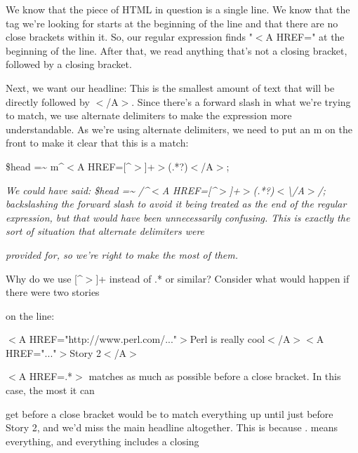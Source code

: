 \documentclass[a4paper,11pt]{book}
\begin{document}
\noindent We know that the piece of HTML in question is a single line. We know that the tag we're looking for starts at the beginning of the line and that there are no close brackets within it. So, our regular expression finds "$<$A HREF=" at the beginning of the line. After that, we read anything that's not a closing bracket, followed by a closing bracket.

\noindent 

\noindent Next, we want our headline: This is the smallest amount of text that will be directly followed by $<$/A$>$. Since there's a forward slash in what we're trying to match, we use alternate delimiters to make the expression more understandable. As we're using alternate delimiters, we need to put an m on the front to make it clear that this is a match:

\noindent 

\noindent \$head =\~{} m\textbar \^{}$<$A HREF=[\^{}$>$]+$>$(.*?)$<$/A$>$\textbar ;

\noindent 

\noindent \textit{We could have said: \$head =\~{} /\^{}$<$A HREF=[\^{}$>$]+$>$(.*?)$<$\textbackslash /A$>$/; backslashing the forward slash to avoid it being treated as the end of the regular expression, but that would have been unnecessarily confusing. This is exactly the sort of situation that alternate delimiters were}

\noindent \textit{provided for, so we're right to make the most of them.}

\noindent 

\noindent 

\noindent Why do we use [\^{}$>$]+ instead of .* or similar? Consider what would happen if there were two stories

\noindent on the line:

\noindent 

\noindent 

\noindent $<$A HREF="http://www.perl.com/..."$>$Perl is really cool$<$/A$>$$<$A HREF="..."$>$Story 2$<$/A$>$

\noindent 

\noindent $<$A HREF=.*$>$ matches as  much  as  possible  before  a  close  bracket.  In  this case,  the  most it  can

\noindent get  before a close bracket would  be  to  match  everything  up until  just before  Story  2,  and we'd  miss the main headline altogether.  This  is  because  . means  everything,  and everything  includes  a  closing
\end{document}
